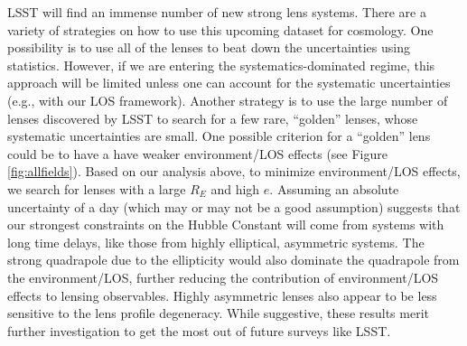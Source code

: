 LSST will find an immense number of new strong lens systems. There are a variety of strategies on how to use this upcoming dataset for cosmology. One possibility is to use all of the lenses to beat down the uncertainties using statistics. However, if we are entering the systematics-dominated regime, this approach will be limited unless one can account for the systematic uncertainties (e.g., with our LOS framework). Another strategy is to use the large number of lenses discovered by LSST to search for a few rare, ``golden'' lenses, whose systematic uncertainties are small. One possible criterion for a ``golden'' lens could be to have a have weaker environment/LOS effects (see Figure \ref{fig:allfields}). Based on our analysis above, to minimize environment/LOS effects, we search for lenses with a large $R_E$ and high $e$. Assuming an absolute uncertainty of a day (which may or may not be a good assumption) suggests that our strongest constraints on the Hubble Constant will come from systems with long time delays, like those from highly elliptical, asymmetric systems. The strong quadrapole due to the ellipticity would also dominate the quadrapole from the environment/LOS, further reducing the contribution of environment/LOS effects to lensing observables. Highly asymmetric lenses also appear to be less sensitive to the lens profile degeneracy. While suggestive, these results merit further investigation to get the most out of future surveys like LSST.
  